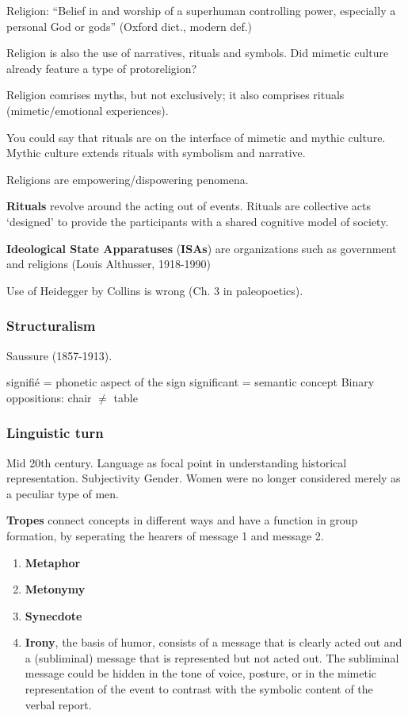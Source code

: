 \documentclass{article}
\begin{document}
Religion: “Belief in and worship of a superhuman controlling power, especially a personal God or gods” (Oxford dict., modern def.)

Religion is also the use of narratives, rituals and symbols. Did mimetic culture already feature a type of protoreligion?

Religion comrises myths, but not exclusively; it also comprises rituals (mimetic/emotional experiences).

You could say that rituals are on the interface of mimetic and mythic culture. Mythic culture extends rituals with symbolism and narrative.

Religions are empowering/dispowering penomena.

\textbf{Rituals} revolve around the acting out of events. Rituals are collective acts ‘designed’ to provide the participants with a shared cognitive model of society. 

\textbf{Ideological State Apparatuses} (\textbf{ISAs}) are organizations such as government and religions (Louis Althusser, 1918-1990)

Use of Heidegger by Collins is wrong (Ch. 3 in paleopoetics).

\subsubsection{Structuralism}

Saussure (1857-1913).

signifi\'{e} = phonetic aspect of the sign
significant = semantic concept
Binary oppositions: chair $\ne$ table

\subsubsection{Linguistic turn}

Mid 20th century.
Language as focal point  in understanding historical representation.
Subjectivity
Gender. Women were no longer considered merely as a peculiar type of men.

\textbf{Tropes} connect concepts in different ways and have a function in group formation, by seperating the hearers of message 1 and message 2.

\begin{enumerate}
  \item \textbf{Metaphor}
  \item \textbf{Metonymy}
  \item \textbf{Synecdote}
  \item \textbf{Irony}, the basis of humor, consists of a message that is clearly acted out and a (subliminal) message that is represented but not acted out. The subliminal message could be hidden in the tone of voice, posture, or in the mimetic representation of the event to contrast with the symbolic content of the verbal report.
\end{enumerate}
\end{document}

